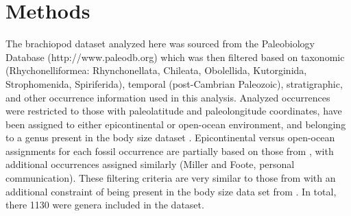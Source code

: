 \documentclass[11pt]{article}
\begin{document}




\section*{Methods}

The brachiopod dataset analyzed here was sourced from the Paleobiology Database (http://www.paleodb.org) which was then filtered based on taxonomic (Rhychonelliformea: Rhynchonellata, Chileata, Obolellida, Kutorginida, Strophomenida, Spiriferida), temporal (post-Cambrian Paleozoic), stratigraphic, and other occurrence information used in this analysis. Analyzed occurrences were restricted to those with paleolatitude and paleolongitude coordinates, have been assigned to either epicontinental or open-ocean environment, and belonging to a genus present in the body size dataset \citep{Payne2014}. Epicontinental versus open-ocean assignments for each fossil occurrence are partially based on those from \citet{Miller2009a}, with additional occurrences assigned similarly (Miller and Foote, personal communication). These filtering criteria are very similar to those from \citet{Foote2013} with an additional constraint of being present in the body size data set from \citet{Payne2014}. In total, there 1130 were genera included in the dataset.
\end{document}
